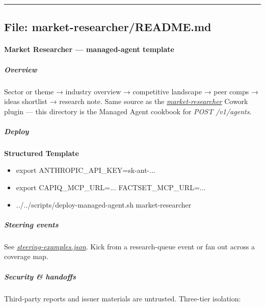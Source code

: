\documentclass[11pt]{article}
\begin{document}
\vspace{0.8em}\hrule\vspace{0.8em}

\subsection{File: market-researcher/README.md}\label{file:market-researcher-README-md}

\paragraph{Market Researcher — managed-agent template}\mbox{}\par

\subparagraph{Overview}\mbox{}\par

Sector or theme → industry overview → competitive landscape → peer comps → ideas shortlist → research note. Same source as the \href{../../plugins/agent-plugins/market-researcher}{\emph{market-researcher}} Cowork plugin — this directory is the Managed Agent cookbook for \emph{POST /v1/agents}.


\subparagraph{Deploy}\mbox{}\par

\textbf{Structured Template}
\begin{itemize}[leftmargin=*,itemsep=2pt,topsep=2pt]
\item {} export ANTHROPIC\_\allowbreak{}API\_\allowbreak{}KEY=sk-ant-...
\item {} export CAPIQ\_\allowbreak{}MCP\_\allowbreak{}URL=... FACTSET\_\allowbreak{}MCP\_\allowbreak{}URL=...
\item {} ../../scripts/deploy-managed-agent.sh market-researcher
\end{itemize}

\subparagraph{Steering events}\mbox{}\par

See \href{./steering-examples.json}{\emph{steering-examples.json}}. Kick from a research-queue event or fan out across a coverage map.


\subparagraph{Security \& handoffs}\mbox{}\par

Third-party reports and issuer materials are untrusted. Three-tier isolation:
\end{document}
